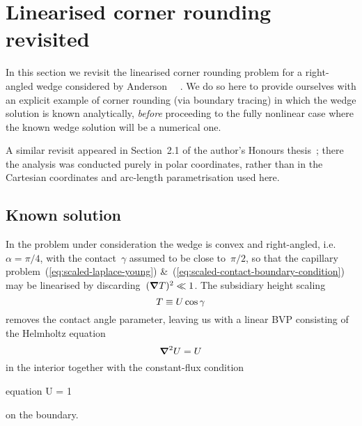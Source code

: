 \section{Linearised corner rounding revisited}
\label{sec:moderate.linearised}

In this section we revisit the linearised corner rounding problem
for a right-angled wedge
considered by Anderson~\etal~%
  \cite{anderson-2007-boundary-tracing-ii-applications}.
We do so here to provide ourselves
with an explicit example of corner rounding (via boundary tracing)
in which the wedge solution is known analytically,
\emph{before} proceeding to the fully nonlinear case
where the known wedge solution will be a numerical one.

A similar revisit appeared in Section~2.1 of
the author's Honours thesis~\cite{li-2017-thesis-rounding-capillary-wedge};
there the analysis was conducted purely in polar coordinates,
rather than in the Cartesian coordinates and arc-length parametrisation
used here.

\subsection{Known solution}
\label{sec:moderate.linearised.known}

In the problem under consideration
the wedge is convex and right-angled, i.e.~$\alpha = \pi/4$,
with the contact~$\gamma$ assumed to be close to~$\pi/2$,
so that the capillary problem~(\ref{eq:scaled-laplace-young})
\&~(\ref{eq:scaled-contact-boundary-condition})
may be linearised by discarding~$(\mathop{}\!\boldsymbol{\mathbf{\nabla}} T)^2 \ll 1$.
The subsidiary height scaling
\begin{equation}
  T \equiv U \cos\gamma
  \label{eq:helmholtz-height-scaling}
\end{equation}
removes the contact angle parameter,
leaving us with a linear BVP consisting of
the Helmholtz equation
\begin{equation}
  \mathop{}\!\boldsymbol{\mathbf{\nabla}}^2 U = U
  \label{eq:scaled-helmholtz}
\end{equation}
in the interior
together with the constant-flux condition
\begin{important}{equation}
  \normalvec \dotp \del U = 1
  \label{eq:scaled-contact-linearised}
\end{important}
on the boundary.

\begin{figure}
  \begin{minipage}[t]{0.4\textwidth}
  \end{minipage}
  \hfill
  \begin{minipage}[t]{0.55\textwidth}
  \end{minipage}
\end{figure}

